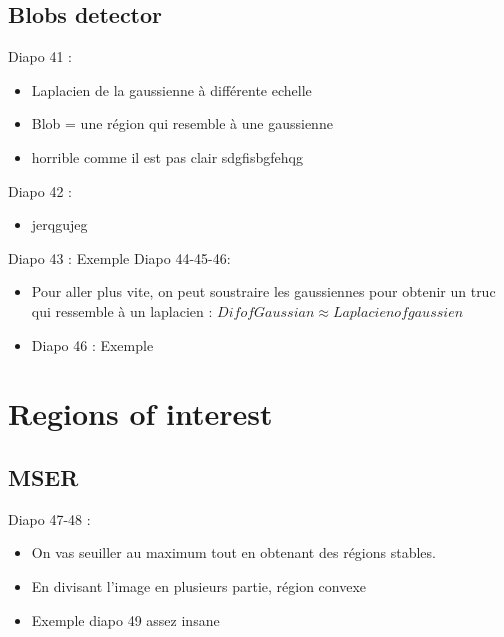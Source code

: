 \documentclass{article}
\theoremstyle{plain}%
\theoremstyle{definition}
\theoremstyle{remark}
\begin{document}
\subsection{Blobs detector}
Diapo 41 : 
\begin{itemize}
    \item Laplacien de la gaussienne à différente echelle
    \item Blob = une région qui resemble à une gaussienne
    \item horrible comme il est pas clair sdgfisbgfehqg
\end{itemize}
Diapo 42 : 
\begin{itemize}
    \item jerqgujeg
\end{itemize}
Diapo 43 : Exemple 
Diapo 44-45-46: 
\begin{itemize}
    \item Pour aller plus vite, on peut soustraire les gaussiennes pour obtenir un truc qui ressemble à un laplacien : $ Dif of Gaussian \approx Laplacien of gaussien $ 
    \item Diapo 46 : Exemple
\end{itemize}

\section{Regions of interest}
\subsection{MSER}
Diapo 47-48 : 
\begin{itemize}
    \item On vas seuiller au maximum tout en obtenant des régions stables.
    \item En divisant l'image en plusieurs partie, région convexe
    \item Exemple diapo 49 assez insane
\end{itemize}
\end{document}
